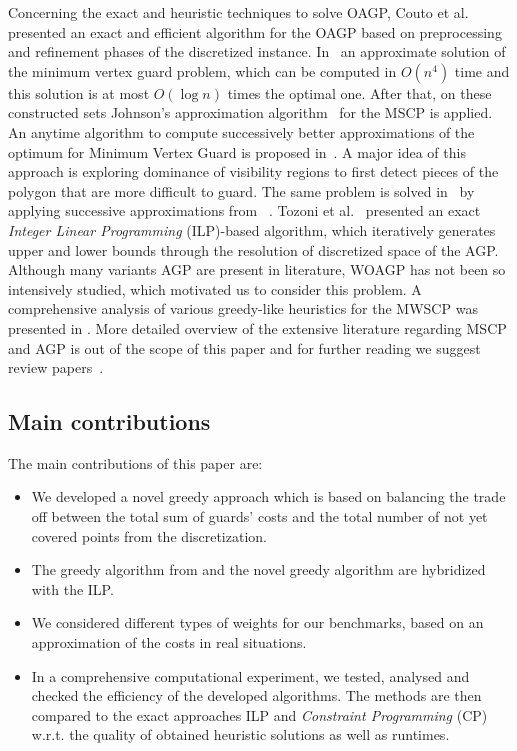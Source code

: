 \documentclass[runningheads,a4paper]{elsarticle}
\begin{document}
	Concerning the exact and heuristic techniques to solve OAGP, Couto et al.~\cite{couto2007exact} presented an exact and efficient algorithm for the OAGP based on preprocessing and refinement phases of the discretized instance. In~\cite{ghosh2010approximation} an approximate solution of the minimum vertex guard problem, which can be computed in $O(n^4)$ time and this solution is at most $O(\log n)$ times the optimal one. After that, on these constructed sets Johnson’s approximation algorithm~\cite{johnson1974approximation} for the MSCP is applied. An anytime algorithm to compute successively better approximations of the optimum for Minimum Vertex Guard is proposed in~\cite{tomas2003approximation}.  A major idea of this approach is exploring dominance of visibility regions to first detect pieces of the polygon that are
	more difficult to guard. The same problem is solved in~\cite{tomas2006visibility} by applying successive approximations from ~\cite{tomas2003approximation}.
	Tozoni et al.~\cite{tozoni2013practical,tozoni2016algorithm}  presented an exact \emph{Integer Linear Programming}  (ILP)-based  algorithm, which iteratively generates upper and lower bounds through the resolution of discretized space of the AGP. Although many variants AGP are present in literature, WOAGP has not been so intensively studied, which motivated us to consider this problem.  A comprehensive analysis of various greedy-like heuristics for the MWSCP  was presented in \cite{vasko2016best}.
	More detailed overview of the extensive literature regarding MSCP and AGP is out of the scope of this paper and for further reading we suggest review papers~\cite{caprara2000algorithms,ren2010new,ghosh2010approximation2}.

	
	\subsection{Main contributions}
	The main contributions of this paper are:
	\begin{itemize}
		\item We developed a novel greedy approach which is based on balancing the trade off between the total sum of guards' costs and the total number of not yet covered points from the discretization.
		\item The  greedy algorithm from \cite{chvatal1979greedy} and the novel greedy algorithm are hybridized with the ILP.
		\item We considered different types of weights for our benchmarks, based on an approximation of the costs in real situations.
		\item In a comprehensive computational experiment,  we tested, analysed and checked the efficiency of the developed algorithms. The methods are then compared to the exact approaches ILP and \emph{Constraint Programming} (CP) w.r.t. the quality of obtained heuristic solutions as well as runtimes.
	\end{itemize}
\end{document}
